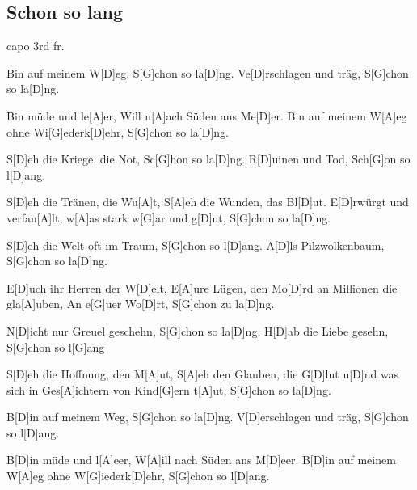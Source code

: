 \subsection*{Schon so lang   }
\begin{guitar}
capo 3rd fr.

Bin auf meinem W[D]eg,
S[G]chon so la[D]ng.
Ve[D]rschlagen und träg, 
S[G]chon so la[D]ng.

Bin müde und le[A]er, 
Will n[A]ach Süden ans Me[D]er.
Bin auf meinem W[A]eg ohne Wi[G]ederk[D]ehr,
S[G]chon so la[D]ng.

S[D]eh die Kriege, die Not,
Sc[G]hon so la[D]ng.
R[D]uinen und Tod,
Sch[G]on so l[D]ang.

S[D]eh die Tränen, die Wu[A]t,
S[A]eh die Wunden, das Bl[D]ut.
E[D]rwürgt und verfau[A]lt,
w[A]as stark w[G]ar und g[D]ut,
S[G]chon so la[D]ng.

S[D]eh die Welt oft im Traum,
S[G]chon so l[D]ang.
A[D]ls Pilzwolkenbaum,
S[G]chon so la[D]ng.

E[D]uch ihr Herren der W[D]elt,
E[A]ure Lügen, den Mo[D]rd an Millionen die gla[A]uben,
An e[G]uer Wo[D]rt,
S[G]chon zu la[D]ng.

N[D]icht nur Greuel geschehn,
S[G]chon so la[D]ng.
H[D]ab die Liebe gesehn,
S[G]chon so l[G]ang

S[D]eh die Hoffnung, den M[A]ut,
S[A]eh den Glauben, die G[D]lut
u[D]nd was sich in Ges[A]ichtern von Kind[G]ern t[A]ut,
S[G]chon so la[D]ng.

B[D]in auf meinem Weg,
S[G]chon so la[D]ng.
V[D]erschlagen und träg,
S[G]chon so l[D]ang.

B[D]in müde und l[A]eer,
W[A]ill nach Süden ans M[D]eer.
B[D]in auf meinem W[A]eg ohne W[G]iederk[D]ehr,
S[G]chon so l[D]ang.
\end{guitar}
